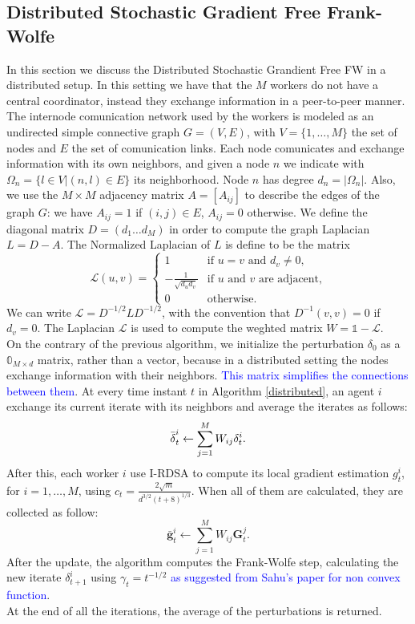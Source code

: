 \subsection{Distributed Stochastic Gradient Free Frank-Wolfe}
In this section we discuss the Distributed Stochastic Grandient Free FW in a distributed setup. In this setting we have that the $M$ workers do not have a central coordinator, instead they exchange information in a peer-to-peer manner. The internode comunication network used by the workers is modeled as an undirected simple connective graph $G=(V,E)$, with $V=\{1, \dots, M\}$ the set of nodes and $E$ the set of comunication links. Each node comunicates and exchange information with its own neighbors, and given a node $n$ we indicate with $\Omega_n = \{l \in V | (n,l)\in E\}$ its neighborhood. Node $n$ has degree $d_n = |\Omega_n|$. Also, we use the $M \times M$ adjacency matrix $A=[A_{ij}]$ to describe the edges of the graph $G$: we have $A_{ij}=1$ if $(i,j) \in E$, $A_{ij}=0$ otherwise. We define the diagonal matrix $D=(d_1 \dots d_M)$ in order to compute the graph Laplacian $L=D-A$. The Normalized Laplacian of $L$ is define to be the matrix
\[
\mathcal{L}(u,v)=
\begin{cases}
	1 & \text{if $u=v$ and }d_v\ne0, \\
	-\frac{1}{\sqrt{d_ud_v}} & \text{if $u$ and $v$ are adjacent,}\\
	0 & \text{otherwise.}
	
\end{cases}
\]
We can write $\mathcal{L} = D^{-1/2}LD^{-1/2}$, with the convention that $D^{-1}(v,v) = 0$ if $d_v=0$. The Laplacian $\mathcal{L}$ is used to compute the weghted matrix $W = \mathbb{1}- \mathcal{L}$.\\
On the contrary of the previous algorithm, we initialize the perturbation \boldmath$\delta_0$ as a $\mathbb{0}_{M \times d}$ matrix, rather than a vector, because in a distributed setting the nodes exchange information with their neighbors. \textcolor{blue}{This matrix simplifies the connections between them}. At every time instant $t$ in Algorithm \ref{distributed}, an agent $i$ exchange its current iterate with its neighbors and average the iterates as follows:
\[\bar{\text{\boldmath}\delta}_t^i \leftarrow \sum_{j=1}^{M} W_{ij}\text{\boldmath}\delta_t^i.\]
After this, each worker $i$ use I-RDSA to compute its local gradient estimation $g_t^i$, for $i= 1, \dots, M$, using $c_t = \frac{2\sqrt{m}}{d^{3/2}(t+8)^{1/3}}$. When all of them are calculated, they are collected as follow:
\[ \bar{\mathbf{g}}_t^i \leftarrow \sum_{j=1}^{M} W_{ij}\mathbf{G}_t^j.\]
After the update, the algorithm computes the Frank-Wolfe step, calculating the new iterate \boldmath$\delta_{t+1}^i$ using $\gamma_t= t^{-1/2}$ \textcolor{blue}{as suggested from Sahu's paper for non convex function}.\\
At the end of all the iterations, the average of the perturbations is returned.\\

